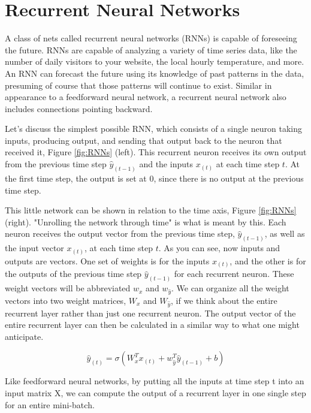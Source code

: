 \section{Recurrent Neural Networks}
A class of nets called recurrent neural networks (RNNs) is capable of foreseeing the future. RNNs are capable of analyzing a variety of time series data, like the number of daily visitors to your website, the local hourly temperature, and more. An RNN can forecast the future using its knowledge of past patterns in the data, presuming of course that those patterns will continue to exist. Similar in appearance to a feedforward neural network, a recurrent neural network also includes connections pointing backward.

\hspace{1cm}

Let's discuss the simplest possible RNN, which consists of a single neuron taking inputs, producing output, and sending that output back to the neuron that received it, Figure \ref{fig:RNNs} (left). This recurrent neuron receives its own output from the previous time step $\hat{y}_{(t-1)}$ and the inputs $x_{(t)}$ at each time step $t$. At the first time step, the output is set at $0$, since there is no output at the previous time step. 

This little network can be shown in relation to the time axis, Figure \ref{fig:RNNs} (right). "Unrolling the network through time" is what is meant by this. Each neuron receives the output vector from the previous time step, $\hat{y}_{(t-1)}$, as well as the input vector $x_{(t)}$, at each time step $t$. As you can see, now inputs and outputs are vectors. One set of weights is for the inputs $x_{(t)}$, and the other is for the outputs of the previous time step $\hat{y}_{(t-1)}$ for each recurrent neuron. These weight vectors will be abbreviated $w_x$ and $w_{\hat{y}}$. We can organize all the weight vectors into two weight matrices, $W_x$ and $W_{\hat{y}}$, if we think about the entire recurrent layer rather than just one recurrent neuron.
The output vector of the entire recurrent layer can then be calculated in a similar way to what one might anticipate.

\begin{equation}
\hat{y}_{(t)} = \sigma \left(W_{x}^{T} x_{(t)} + w_{\hat{y}}^{T} \hat{y}_{(t-1)} + b \right)
\end{equation}

Like feedforward neural networks, by putting all the inputs at time step t into an input matrix X, we can compute the output of a recurrent layer in one single step for an entire mini-batch.
    
